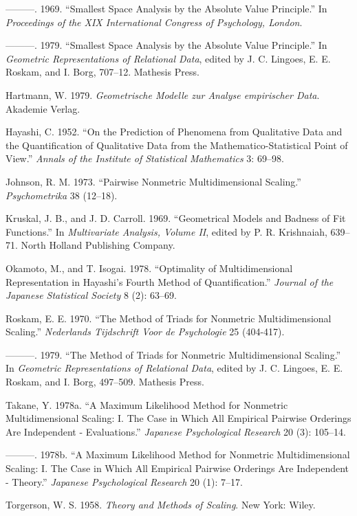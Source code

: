 \documentclass[
  12pt,
]{article}
\newlength{\cslhangindent}
\newenvironment{CSLReferences}[2] %
 {\begin{list}{}{%
  \setlength{\itemindent}{0pt}
  \setlength{\leftmargin}{0pt}
  \setlength{\parsep}{0pt}
  \ifodd #1
   \setlength{\leftmargin}{\cslhangindent}
   \setlength{\itemindent}{-1\cslhangindent}
  \fi
  \setlength{\itemsep}{#2\baselineskip}}}
 {\end{list}}
\begin{document}
\begin{CSLReferences}{1}{0}
---------. 1969. {``{Smallest Space Analysis by the Absolute Value Principle}.''} In \emph{{Proceedings of the XIX International Congress of Psychology, London}}.

---------. 1979. {``Smallest Space Analysis by the Absolute Value Principle.''} In \emph{{Geometric Representations of Relational Data}}, edited by J. C. Lingoes, E. E. Roskam, and I. Borg, 707--12. Mathesis Press.

Hartmann, W. 1979. \emph{{Geometrische Modelle zur Analyse empirischer Data}}. Akademie Verlag.

Hayashi, C. 1952. {``On the Prediction of Phenomena from Qualitative Data and the Quantification of Qualitative Data from the Mathematico-Statistical Point of View.''} \emph{Annals of the Institute of Statistical Mathematics} 3: 69--98.

Johnson, R. M. 1973. {``{Pairwise Nonmetric Multidimensional Scaling}.''} \emph{Psychometrika} 38 (12--18).

Kruskal, J. B., and J. D. Carroll. 1969. {``{Geometrical Models and Badness of Fit Functions}.''} In \emph{Multivariate Analysis, Volume II}, edited by P. R. Krishnaiah, 639--71. North Holland Publishing Company.

Okamoto, M., and T. Isogai. 1978. {``Optimality of Multidimensional Representation in Hayashi's Fourth Method of Quantification.''} \emph{Journal of the Japanese Statistical Society} 8 (2): 63--69.

Roskam, E. E. 1970. {``The Method of Triads for Nonmetric Multidimensional Scaling.''} \emph{Nederlands Tijdschrift Voor de Psychologie} 25 (404-417).

---------. 1979. {``The Method of Triads for Nonmetric Multidimensional Scaling.''} In \emph{{Geometric Representations of Relational Data}}, edited by J. C. Lingoes, E. E. Roskam, and I. Borg, 497--509. Mathesis Press.

Takane, Y. 1978a. {``A Maximum Likelihood Method for Nonmetric Multidimensional Scaling: I. The Case in Which All Empirical Pairwise Orderings Are Independent - Evaluations.''} \emph{Japanese Psychological Research} 20 (3): 105--14.

---------. 1978b. {``A Maximum Likelihood Method for Nonmetric Multidimensional Scaling: I. The Case in Which All Empirical Pairwise Orderings Are Independent - Theory.''} \emph{Japanese Psychological Research} 20 (1): 7--17.

Torgerson, W. S. 1958. \emph{{Theory and Methods of Scaling}}. New York: Wiley.

\end{CSLReferences}
\end{document}
